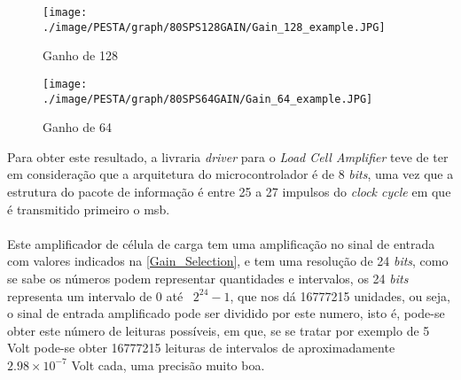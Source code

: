 \begin{minipage}[!b]{\linewidth}
\begin{minipage}[!b]{.43\linewidth}
\begin{figure}[H]
	\captionsetup{justification=raggedright,singlelinecheck=false}
	\flushleft
	\texttt{[image: ./image/PESTA/graph/80SPS128GAIN/Gain\_128\_example.JPG]}
	\caption{Ganho de 128}
	\label{Gain_128_example}
\end{figure}
\end{minipage}
\hspace{.8cm}
\begin{minipage}[!b]{.43\linewidth}
\begin{figure}[H]
	\captionsetup{justification=raggedright,singlelinecheck=false}
	\flushleft
	\texttt{[image: ./image/PESTA/graph/80SPS64GAIN/Gain\_64\_example.JPG]}
	\caption{Ganho de 64}
	\label{Gain_64_example}
\end{figure}
\end{minipage}
\end{minipage}
Para obter este resultado, a livraria \textit{driver} para o \textit{Load Cell Amplifier} teve de ter em consideração que a arquitetura do microcontrolador é de 8 \textit{bits}, uma vez que a estrutura do pacote de informação é entre 25 a 27 impulsos do \textit{clock cycle} em que é transmitido primeiro o \ac{msb}.
\\
\\
Este amplificador de célula de carga tem uma amplificação no sinal de entrada com valores indicados na \autoref{Gain_Selection}, e tem uma resolução de 24 \textit{bits}, como se sabe os números podem representar quantidades e intervalos, os 24 \textit{bits} representa um intervalo de 0 até \, $2^{24}-1$, que nos dá 16777215 unidades, ou seja, o sinal de entrada amplificado pode ser dividido por este numero, isto é, pode-se obter este número de leituras possíveis, em que, se se tratar por exemplo de 5 Volt pode-se obter 16777215 leituras de intervalos de aproximadamente $2.98 \times 10^{-7}$ Volt cada, uma precisão muito boa.
